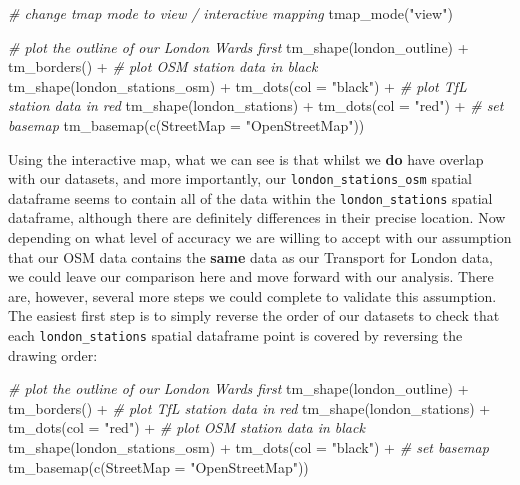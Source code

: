\documentclass[
]{book}
\newenvironment{Shaded}{\begin{snugshade}}{\end{snugshade}}
\newcommand{\AttributeTok}[1]{\textcolor[rgb]{0.77,0.63,0.00}{#1}}
\newcommand{\CommentTok}[1]{\textcolor[rgb]{0.56,0.35,0.01}{\textit{#1}}}
\newcommand{\FunctionTok}[1]{\textcolor[rgb]{0.00,0.00,0.00}{#1}}
\newcommand{\NormalTok}[1]{#1}
\newcommand{\SpecialCharTok}[1]{\textcolor[rgb]{0.00,0.00,0.00}{#1}}
\newcommand{\StringTok}[1]{\textcolor[rgb]{0.31,0.60,0.02}{#1}}
\begin{document}
\begin{Shaded}
\begin{Highlighting}[]
\CommentTok{\# change tmap mode to view / interactive mapping}
\FunctionTok{tmap\_mode}\NormalTok{(}\StringTok{"view"}\NormalTok{)}

\CommentTok{\# plot the outline of our London Wards first}
\FunctionTok{tm\_shape}\NormalTok{(london\_outline) }\SpecialCharTok{+} \FunctionTok{tm\_borders}\NormalTok{() }\SpecialCharTok{+}
  \CommentTok{\# plot OSM station data in black}
  \FunctionTok{tm\_shape}\NormalTok{(london\_stations\_osm) }\SpecialCharTok{+} \FunctionTok{tm\_dots}\NormalTok{(}\AttributeTok{col =} \StringTok{"black"}\NormalTok{) }\SpecialCharTok{+}
  \CommentTok{\# plot TfL station data in red}
  \FunctionTok{tm\_shape}\NormalTok{(london\_stations) }\SpecialCharTok{+} \FunctionTok{tm\_dots}\NormalTok{(}\AttributeTok{col =} \StringTok{"red"}\NormalTok{) }\SpecialCharTok{+}
  \CommentTok{\# set basemap}
  \FunctionTok{tm\_basemap}\NormalTok{(}\FunctionTok{c}\NormalTok{(}\AttributeTok{StreetMap =} \StringTok{"OpenStreetMap"}\NormalTok{))}
\end{Highlighting}
\end{Shaded}

Using the interactive map, what we can see is that whilst we \textbf{do} have overlap with our datasets, and more importantly, our \texttt{london\_stations\_osm} spatial dataframe seems to contain all of the data within the \texttt{london\_stations} spatial dataframe, although there are definitely differences in their precise location. Now depending on what level of accuracy we are willing to accept with our assumption that our OSM data contains the \textbf{same} data as our Transport for London data, we could leave our comparison here and move forward with our analysis. There are, however, several more steps we could complete to validate this assumption. The easiest first step is to simply reverse the order of our datasets to check that each \texttt{london\_stations} spatial dataframe point is covered by reversing the drawing order:

\begin{Shaded}
\begin{Highlighting}[]
\CommentTok{\# plot the outline of our London Wards first}
\FunctionTok{tm\_shape}\NormalTok{(london\_outline) }\SpecialCharTok{+} \FunctionTok{tm\_borders}\NormalTok{() }\SpecialCharTok{+}
  \CommentTok{\# plot TfL station data in red}
  \FunctionTok{tm\_shape}\NormalTok{(london\_stations) }\SpecialCharTok{+} \FunctionTok{tm\_dots}\NormalTok{(}\AttributeTok{col =} \StringTok{"red"}\NormalTok{) }\SpecialCharTok{+}
  \CommentTok{\# plot OSM station data in black}
  \FunctionTok{tm\_shape}\NormalTok{(london\_stations\_osm) }\SpecialCharTok{+} \FunctionTok{tm\_dots}\NormalTok{(}\AttributeTok{col =} \StringTok{"black"}\NormalTok{) }\SpecialCharTok{+}
  \CommentTok{\# set basemap}
  \FunctionTok{tm\_basemap}\NormalTok{(}\FunctionTok{c}\NormalTok{(}\AttributeTok{StreetMap =} \StringTok{"OpenStreetMap"}\NormalTok{))}
\end{Highlighting}
\end{Shaded}
\end{document}
